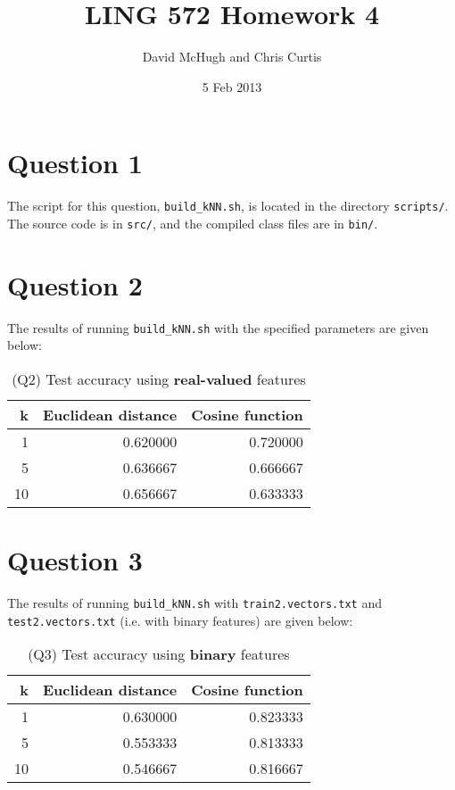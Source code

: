 \documentclass[oneside,justified,marginals=raggedouter]{tufte-handout}
\title{LING 572 Homework 4}
\author{David McHugh and Chris Curtis}
\date{5 Feb 2013}
\begin{document}
\maketitle


\section{Question 1}

The script for this question, \texttt{\small build\_kNN.sh}, is located in the
directory \texttt{\small scripts/}. The source code is in \texttt{\small src/}, and the
compiled class files are in \texttt{\small bin/}.

\section{Question 2}

The results of running \texttt{\small build\_kNN.sh} with the specified
parameters are given below:

\begin{table}[h]
\begin{tabular}{@{}rrr@{}}
\toprule
k & Euclidean distance & Cosine function \\ \midrule
1 & 0.620000 & 0.720000 \\
5 & 0.636667 & 0.666667 \\
10 & 0.656667 & 0.633333 \\
\bottomrule
\end{tabular}
\caption{(Q2) Test accuracy using {\bf real-valued} features}
\end{table}

\section{Question 3}

The results of running \texttt{\small build\_kNN.sh} with \texttt{\small train2.vectors.txt}
and \texttt{\small test2.vectors.txt} (i.e. with binary features) are given below:

\begin{table}[h]
\begin{tabular}{@{}rrr@{}}
\toprule
k & Euclidean distance & Cosine function \\ \midrule
1 & 0.630000 & 0.823333 \\
5 & 0.553333 & 0.813333 \\
10 & 0.546667 & 0.816667 \\
\bottomrule
\end{tabular}
\caption{(Q3) Test accuracy using {\bf binary} features}
\end{table}
\end{document}
